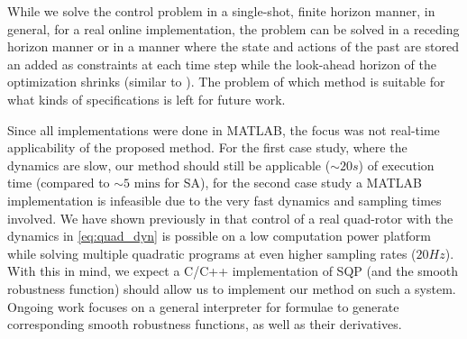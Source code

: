 While we solve the control problem in a single-shot, finite horizon manner, in general, for a real online implementation, the problem can be solved in a receding horizon manner or in a manner where the state and actions of the past are stored an added as constraints at each time step while the look-ahead horizon of the optimization shrinks (similar to \cite{Raman14_MPCSTL}). The problem of which method is suitable for what kinds of specifications is left for future work.

Since all implementations were done in MATLAB, the focus was not real-time applicability of the proposed method. For the first case study, where the dynamics are slow, our method should still be applicable ($\sim 20s$) of execution time (compared to $\sim 5 \text{ mins}$ for SA), for the second case study a MATLAB implementation is infeasible due to the very fast dynamics and sampling times involved. We have shown previously in \cite{PantAMNDM15_Anytime} that control of a real quad-rotor with the dynamics in \eqref{eq:quad_dyn} is possible on a low computation power platform while solving multiple quadratic programs at even higher sampling rates ($20Hz$). With this in mind, we expect a C/C++ implementation of SQP (and the smooth robustness function) should allow us to implement our method on such a system. Ongoing work focuses on a general interpreter for formulae to generate corresponding smooth robustness functions, as well as their derivatives.